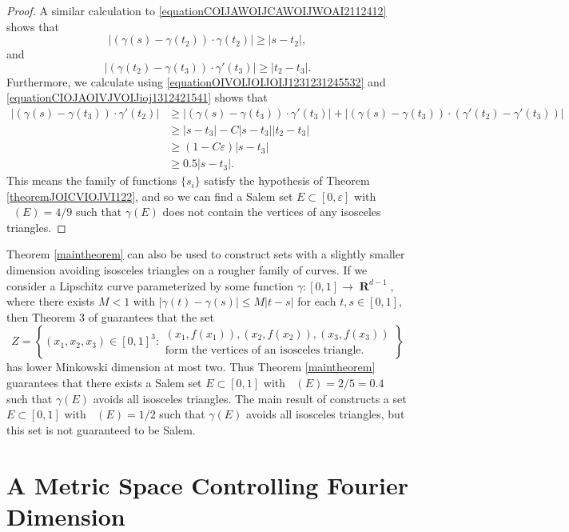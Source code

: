 \documentclass[dvipsnames,letterpaper,12pt]{article}
\numberwithin{equation}{section}
\DeclareMathOperator{\hausdim}{\dim_{\mathbf{H}}}
\DeclareMathOperator{\fordim}{\dim_{\mathbf{F}}}
\DeclareMathOperator{\RR}{\mathbf{R}}
\numberwithin{theorem}{section}
\begin{document}
\begin{proof}
    A similar calculation to \eqref{equationCOIJAWOIJCAWOIJWOAI2112412} shows that
    \[ |(\gamma(s) - \gamma(t_2)) \cdot \gamma(t_2)| \geq |s - t_2|, \]
    and
    \[ |(\gamma(t_2) - \gamma(t_3)) \cdot \gamma'(t_3)| \geq |t_2 - t_3|. \]
    Furthermore, we calculate using \eqref{equationOIVOIJOIJOIJ1231231245532} and \eqref{equationCIOJAOIVJVOIJioj1312421541} shows that
    \begin{align*}
        |(\gamma(s) - \gamma(t_3)) \cdot \gamma'(t_2)| &\geq |(\gamma(s) - \gamma(t_3)) \cdot \gamma'(t_3)| + |(\gamma(s) - \gamma(t_3)) \cdot (\gamma'(t_2) - \gamma'(t_3))|\\
        &\geq |s - t_3| - C|s - t_3||t_2 - t_3|\\
        &\geq (1 - C\varepsilon) |s - t_3|\\
        &\geq 0.5 |s - t_3|.
    \end{align*}
    This means the family of functions $\{ s_i \}$ satisfy the hypothesis of Theorem \ref{theoremJOICVIOJVI122}, and so we can find a Salem set $E \subset [0,\varepsilon]$ with $\fordim(E) = 4/9$ such that $\gamma(E)$ does not contain the vertices of any isosceles triangles.
\end{proof}

Theorem \ref{maintheorem} can also be used to construct sets with a slightly smaller dimension avoiding isosceles triangles on a rougher family of curves. If we consider a Lipschitz curve parameterized by some function $\gamma: [0,1] \to \RR^{d-1}$, where there exists $M < 1$ with $|\gamma(t) - \gamma(s)| \leq M |t - s|$ for each $t,s \in [0,1]$, then Theorem 3 of \cite{OurPaper} guarantees that the set
%
\[ Z = \left\{ (x_1,x_2,x_3) \in [0,1]^3 : \begin{array}{c}
            \text{$(x_1,f(x_1)), (x_2,f(x_2)), (x_3,f(x_3))$}\\
            \text{form the vertices of an isosceles triangle.} \end{array} \right\} \]
%
has lower Minkowski dimension at most two. Thus Theorem \ref{maintheorem} guarantees that there exists a Salem set $E \subset [0,1]$ with $\fordim(E) = 2/5 = 0.4$ such that $\gamma(E)$ avoids all isosceles triangles. The main result of \cite{PramanikFraser} constructs a set $E \subset [0,1]$ with $\hausdim(E) = 1/2$ such that $\gamma(E)$ avoids all isosceles triangles, but this set is not guaranteed to be Salem.



\section{A Metric Space Controlling Fourier Dimension}
\end{document}
